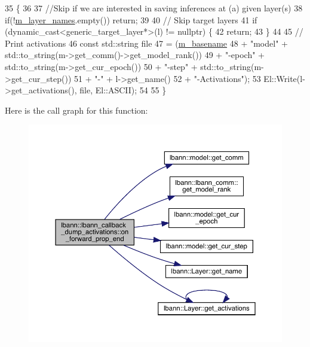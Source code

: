 \begin{DoxyCode}
35                                                                             \{
36 
37   \textcolor{comment}{//Skip if we are interested in saving inferences at (a) given layer(s)}
38   \textcolor{keywordflow}{if}(!\hyperlink{classlbann_1_1lbann__callback__dump__activations_aac56e32b6bef7923046c408f3a2dc857}{m\_layer\_names}.empty()) \textcolor{keywordflow}{return};
39 
40   \textcolor{comment}{// Skip target layers}
41   \textcolor{keywordflow}{if} (dynamic\_cast<generic\_target\_layer*>(l) != \textcolor{keyword}{nullptr}) \{
42     \textcolor{keywordflow}{return};
43   \}
44 
45   \textcolor{comment}{// Print activations}
46   \textcolor{keyword}{const} std::string file
47     = (\hyperlink{classlbann_1_1lbann__callback__dump__activations_a5775d9317de386e07cbd137122db6ee6}{m\_basename}
48        + \textcolor{stringliteral}{"model"} + std::to\_string(m->get\_comm()->get\_model\_rank())
49        + \textcolor{stringliteral}{"-epoch"} + std::to\_string(m->get\_cur\_epoch())
50        + \textcolor{stringliteral}{"-step"} + std::to\_string(m->get\_cur\_step())
51        + \textcolor{stringliteral}{"-"} + l->get\_name()
52        + \textcolor{stringliteral}{"-Activations"});
53   El::Write(l->get\_activations(), file, El::ASCII);
54 
55 \}
\end{DoxyCode}
Here is the call graph for this function\+:\nopagebreak
\begin{figure}[H]
\begin{center}
\leavevmode
\includegraphics[width=350pt]{classlbann_1_1lbann__callback__dump__activations_acf4429a44ead6ffea303528618bc6572_cgraph}
\end{center}
\end{figure}
